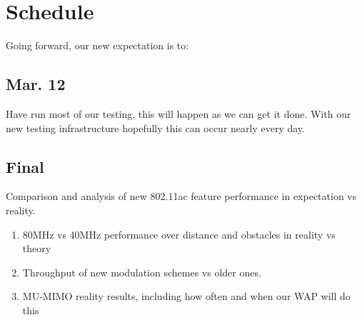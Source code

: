 \section{Schedule}


Going forward, our new expectation is to:

\subsection{Mar. 12}
Have run most of our testing, this will happen as we can get it
done. With our new testing infrastructure hopefully this can occur
nearly every day.

\subsection{Final}
Comparison and analysis of new 802.11ac feature performance in expectation vs reality.
\begin{enumerate}
\item 80MHz vs 40MHz performance over distance and obstacles in reality vs theory
\item Throughput of new modulation schemes vs older ones.
\item MU-MIMO reality results, including how often and when our WAP will do this
\end{enumerate}
